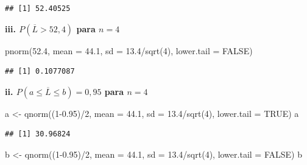 \documentclass[
]{book}
\newenvironment{Shaded}{\begin{snugshade}}{\end{snugshade}}
\newcommand{\AttributeTok}[1]{\textcolor[rgb]{0.77,0.63,0.00}{#1}}
\newcommand{\ConstantTok}[1]{\textcolor[rgb]{0.00,0.00,0.00}{#1}}
\newcommand{\DecValTok}[1]{\textcolor[rgb]{0.00,0.00,0.81}{#1}}
\newcommand{\FloatTok}[1]{\textcolor[rgb]{0.00,0.00,0.81}{#1}}
\newcommand{\FunctionTok}[1]{\textcolor[rgb]{0.00,0.00,0.00}{#1}}
\newcommand{\NormalTok}[1]{#1}
\newcommand{\OtherTok}[1]{\textcolor[rgb]{0.56,0.35,0.01}{#1}}
\newcommand{\SpecialCharTok}[1]{\textcolor[rgb]{0.00,0.00,0.00}{#1}}
\begin{document}
\begin{verbatim}
## [1] 52.40525
\end{verbatim}

\textbf{iii. \(P(\overline{L} > 52,4)\) para \(n = 4\)}

\begin{Shaded}
\begin{Highlighting}[]
\FunctionTok{pnorm}\NormalTok{(}\FloatTok{52.4}\NormalTok{, }
      \AttributeTok{mean =} \FloatTok{44.1}\NormalTok{, }
      \AttributeTok{sd =} \FloatTok{13.4}\SpecialCharTok{/}\FunctionTok{sqrt}\NormalTok{(}\DecValTok{4}\NormalTok{), }
      \AttributeTok{lower.tail =} \ConstantTok{FALSE}\NormalTok{)}
\end{Highlighting}
\end{Shaded}

\begin{verbatim}
## [1] 0.1077087
\end{verbatim}

\textbf{ii. \(P(a \le \overline{L} \le b) = 0,95\) para \(n = 4\)}

\begin{Shaded}
\begin{Highlighting}[]
\NormalTok{a }\OtherTok{\textless{}{-}} \FunctionTok{qnorm}\NormalTok{((}\DecValTok{1}\FloatTok{{-}0.95}\NormalTok{)}\SpecialCharTok{/}\DecValTok{2}\NormalTok{, }
      \AttributeTok{mean =} \FloatTok{44.1}\NormalTok{, }
      \AttributeTok{sd =} \FloatTok{13.4}\SpecialCharTok{/}\FunctionTok{sqrt}\NormalTok{(}\DecValTok{4}\NormalTok{), }
      \AttributeTok{lower.tail =} \ConstantTok{TRUE}\NormalTok{)}
\NormalTok{a}
\end{Highlighting}
\end{Shaded}

\begin{verbatim}
## [1] 30.96824
\end{verbatim}

\begin{Shaded}
\begin{Highlighting}[]
\NormalTok{b }\OtherTok{\textless{}{-}} \FunctionTok{qnorm}\NormalTok{((}\DecValTok{1}\FloatTok{{-}0.95}\NormalTok{)}\SpecialCharTok{/}\DecValTok{2}\NormalTok{, }
      \AttributeTok{mean =} \FloatTok{44.1}\NormalTok{, }
      \AttributeTok{sd =} \FloatTok{13.4}\SpecialCharTok{/}\FunctionTok{sqrt}\NormalTok{(}\DecValTok{4}\NormalTok{), }
      \AttributeTok{lower.tail =} \ConstantTok{FALSE}\NormalTok{)}
\NormalTok{b}
\end{Highlighting}
\end{Shaded}
\end{document}
